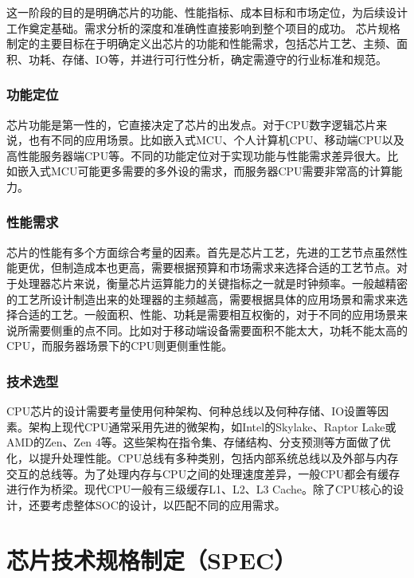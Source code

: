 这一阶段的目的是明确芯片的功能、性能指标、成本目标和市场定位，为后续设计工作奠定基础。需求分析的深度和准确性直接影响到整个项目的成功。
芯片规格制定的主要目标在于明确定义出芯片的功能和性能需求，包括芯片工艺、主频、面积、功耗、存储、IO等，并进行可行性分析，确定需遵守的行业标准和规范。

\subsubsection{功能定位}\label{sec:16-chip-frontend-004}

芯片功能是第一性的，它直接决定了芯片的出发点。对于CPU数字逻辑芯片来说，也有不同的应用场景。比如嵌入式MCU、个人计算机CPU、移动端CPU以及高性能服务器端CPU等。不同的功能定位对于实现功能与性能需求差异很大。比如嵌入式MCU可能更多需要的多外设的需求，而服务器CPU需要非常高的计算能力。

\subsubsection{性能需求}\label{sec:16-chip-frontend-005}

芯片的性能有多个方面综合考量的因素。首先是芯片工艺，先进的工艺节点虽然性能更优，但制造成本也更高，需要根据预算和市场需求来选择合适的工艺节点。对于处理器芯片来说，衡量芯片运算能力的关键指标之一就是时钟频率。一般越精密的工艺所设计制造出来的处理器的主频越高，需要根据具体的应用场景和需求来选择合适的工艺。一般面积、性能、功耗是需要相互权衡的，对于不同的应用场景来说所需要侧重的点不同。比如对于移动端设备需要面积不能太大，功耗不能太高的CPU，而服务器场景下的CPU则更侧重性能。

\subsubsection{技术选型}\label{sec:16-chip-frontend-006}

CPU芯片的设计需要考量使用何种架构、何种总线以及何种存储、IO设置等因素。架构上现代CPU通常采用先进的微架构，如Intel的Skylake、Raptor
Lake或AMD的Zen、Zen
4等。这些架构在指令集、存储结构、分支预测等方面做了优化，以提升处理性能。CPU总线有多种类别，包括内部系统总线以及外部与内存交互的总线等。为了处理内存与CPU之间的处理速度差异，一般CPU都会有缓存进行作为桥梁。现代CPU一般有三级缓存L1、L2、L3
Cache。除了CPU核心的设计，还要考虑整体SOC的设计，以匹配不同的应用需求。

\section{芯片技术规格制定（SPEC）}\label{sec:16-chip-frontend-007}

